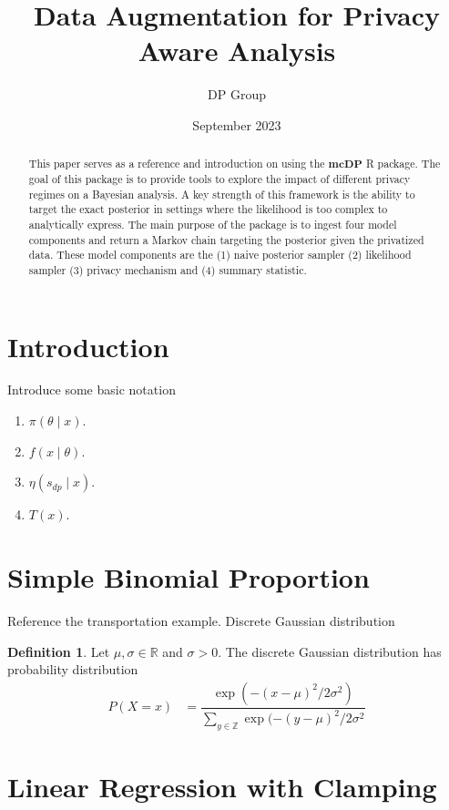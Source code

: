 \documentclass{article}\usepackage[]{graphicx}\usepackage[]{xcolor}
\title{Data Augmentation for Privacy Aware Analysis}
\author{DP Group}
\date{September 2023}
\theoremstyle{definition}
\newtheorem{definition}{Definition}[section]
\newcommand{\dpn}{\textbf{mcDP}}
\begin{document}
\maketitle

\begin{abstract}
    This paper serves as a reference and introduction on using the $\dpn$ R
    package. The goal of this package is to provide tools to explore the
    impact of different privacy regimes on a Bayesian analysis. A key strength of
    this framework is the ability to target the exact posterior in settings
    where the likelihood is too complex to analytically express. The main
    purpose of the package is to ingest four model components and return
    a Markov chain targeting the posterior given the privatized data. These
    model components are the (1) naive posterior sampler (2) likelihood sampler
    (3) privacy mechanism and (4) summary statistic.
\end{abstract}

\section*{Introduction}
Introduce some basic notation

\begin{enumerate}
  \item $\pi(\theta \mid x)$.
  \item $f(x \mid \theta)$.
  \item $\eta(s_{dp} \mid x)$.
  \item $T(x)$.
\end{enumerate}

\section*{Simple Binomial Proportion}
Reference the transportation example. Discrete Gaussian distribution

\begin{definition}
Let $\mu, \sigma \in \mathbb{R}$  and $\sigma > 0$. The discrete Gaussian
distribution has probability distribution
\begin{align*}
P(X = x) &= \dfrac{\exp(-(x-\mu)^2/2\sigma^2)}{\sum_{y \in \mathbb{Z}} \exp(-(y-\mu)^2/2\sigma^2}
\end{align*}
\end{definition}

\section*{Linear Regression with Clamping}
\end{document}
